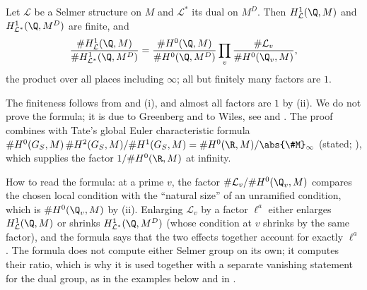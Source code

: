 \begin{theorem}\label{thm:galcoh:greenberg-wiles}
Let $\mathcal L$ be a Selmer structure on $M$ and $\mathcal L^*$ its dual on $M^D$. Then $H^1_{\mathcal L}(\Q,M)$ and $H^1_{\mathcal L^*}(\Q,M^D)$ are finite, and
\[
\frac{\#H^1_{\mathcal L}(\Q,M)}{\#H^1_{\mathcal L^*}(\Q,M^D)}=\frac{\#H^0(\Q,M)}{\#H^0(\Q,M^D)}\prod_v\frac{\#\mathcal L_v}{\#H^0(\Q_v,M)},
\]
the product over all places including $\infty$; all but finitely many factors are $1$.
\end{theorem}

\noindent The finiteness follows from  and (i), and almost all factors are $1$ by
(ii). We do not prove the formula; it is due to Greenberg and to Wiles, see \cite[Section 1]{Wiles95} and
\cite[Section 2]{DDT}. The proof combines  with Tate's global Euler characteristic formula
$\#H^0(G_S,M)\,\#H^2(G_S,M)/\#H^1(G_S,M)=\#H^0(\R,M)/\abs{\#M}_\infty$ (stated; \cite[Chapter I, Section 5]{MilneADT}), which supplies the factor $1/\#H^0(\R,M)$ at
infinity.

\noindent How to read the formula: at a prime $v$, the factor $\#\mathcal L_v/\#H^0(\Q_v,M)$ compares the chosen local condition with the ``natural size'' of an unramified condition, which is
$\#H^0(\Q_v,M)$ by (ii). Enlarging $\mathcal L_v$ by a factor $\ell^a$ either enlarges $H^1_{\mathcal L}(\Q,M)$ or shrinks
$H^1_{\mathcal L^*}(\Q,M^D)$ (whose condition at $v$ shrinks by the same factor), and the formula says that the two effects together account for exactly $\ell^a$. The
formula does not compute either Selmer group on its own; it computes their ratio, which is why it is used together with a separate vanishing statement for the dual
group, as in the examples below and in .

